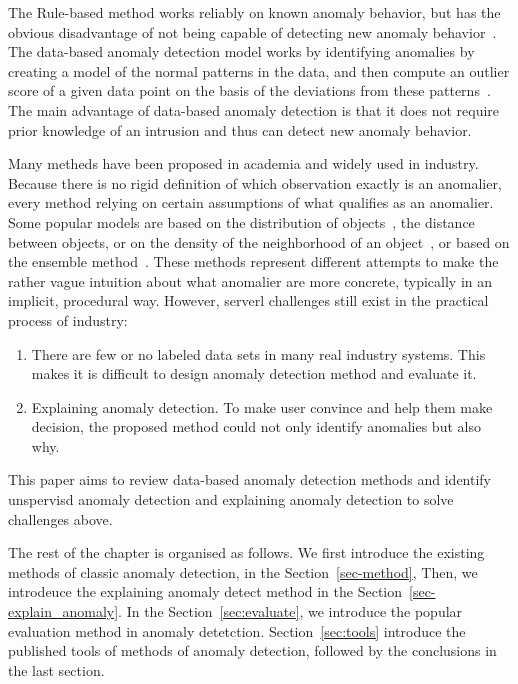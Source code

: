 The Rule-based method works reliably on known anomaly behavior,
but has the obvious disadvantage of not being capable of
detecting new anomaly behavior~\cite{chandola2009anomaly}.
The data-based anomaly detection model works by
identifying anomalies by creating a model of
the normal patterns in the data,
and then compute an outlier score of a given data point
on the basis of the deviations from these patterns~\cite{chandola2009anomaly}.
The main advantage of data-based anomaly detection is that
it does not require prior knowledge of an intrusion and
thus can detect new anomaly behavior.

Many metheds have been proposed in academia and
widely used in industry.
Because there is no rigid definition of which
observation exactly is an anomalier,
every method relying on certain assumptions of
what qualifies as an anomalier.
Some popular models are based on
the distribution of
objects~\cite{siripanadorn2010anomaly,chandola2009anomaly,kromanis2013support},
the distance~\cite{knorr1997unified}
between objects,
or on the density of
the neighborhood of
an object~\cite{agyemang2004algorithm,breunig2000lof,papadimitriou2003loci},
or based on the ensemble method~\cite{zhou2012ensemble}.
These methods represent different attempts to make
the rather vague intuition about
what anomalier are more concrete,
typically in an implicit,
procedural way.
However,
serverl challenges still exist
in the practical  process of industry:
\begin{enumerate}
    \item There are few or no labeled data sets in
    many real industry systems.
    This makes it is difficult to design anomaly detection method and evaluate it. 
    \item Explaining anomaly detection.
    To make  user convince and help them make decision,
    the proposed method could not only identify anomalies but also
    why.
\end{enumerate}
This paper aims to review data-based anomaly detection methods and
identify unspervisd anomaly detection and explaining anomaly detection
to solve challenges above.

The rest of the chapter is organised as follows.
We first introduce the existing methods of classic anomaly detection,
in the Section~\ref{sec-method},
Then,
we introdeuce the explaining anomaly detect method
in the Section~\ref{sec-explain_anomaly}.
In the Section~\ref{sec:evaluate},
we introduce the popular evaluation method in anomaly detetction.
Section~\ref{sec:tools} introduce the published tools of
methods of anomaly detection,
followed by the conclusions in the last section.

